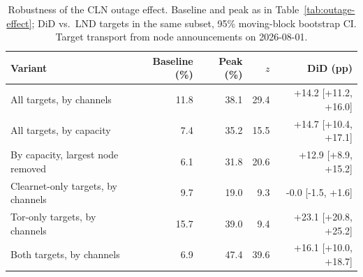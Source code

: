 \begin{table}[t]
\centering
\caption{Robustness of the CLN outage effect. Baseline and peak as in Table~\ref{tab:outage-effect};
DiD vs.\ LND targets in the same subset, 95\% moving-block bootstrap CI. Target transport from node
announcements on 2026-08-01.}
\label{tab:outage-robustness}
\small
\begin{tabular}{lrrrr}
\toprule
Variant & Baseline (\%) & Peak (\%) & $z$ & DiD (pp) \\
\midrule
All targets, by channels & 11.8 & 38.1 & 29.4 & +14.2 [+11.2, +16.0] \\
All targets, by capacity & 7.4 & 35.2 & 15.5 & +14.7 [+10.4, +17.1] \\
By capacity, largest node removed & 6.1 & 31.8 & 20.6 & +12.9 [+8.9, +15.2] \\
Clearnet-only targets, by channels & 9.7 & 19.0 & 9.3 & -0.0 [-1.5, +1.6] \\
Tor-only targets, by channels & 15.7 & 39.0 & 9.4 & +23.1 [+20.8, +25.2] \\
Both targets, by channels & 6.9 & 47.4 & 39.6 & +16.1 [+10.0, +18.7] \\
\bottomrule
\end{tabular}
\end{table}
